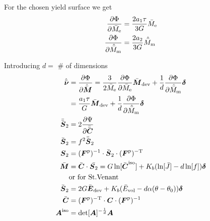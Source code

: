 \documentclass[a4paper,11pt]{article}
\newcommand{\ts}[1]{\text{\boldmath $#1$}}
\newcommand{\pderiv}[2]{\frac{\partial #1}{\partial #2}}
\newcommand{\dev}{{\rm dev}}
\newcommand{\vol}{{\rm vol}}
\newcommand{\iso}{{\rm iso}}
\newcommand{\rme}{{\rm e}}
\newcommand{\rmm}{{\rm m}}
\newcommand{\rmp}{{\rm p}}
\newcommand{\rmT}{{\rm T}}
\newcommand{\old}{{}^{\rm n}}
\providecommand{\abs}[1]{\lvert#1\rvert}
\begin{document}
For the chosen yield surface we get
\begin{align*}
	\pderiv{\Phi}{\bar M_\rme} &= \frac{2 a_1\tau}{3G}\bar M_\rme\\
	\pderiv{\Phi}{\hat{\bar M}_\rmm} &= \frac{2 a_2}{3G}\hat{\bar M}_\rmm 
\end{align*}

Introducing $d = $ \# of dimensions
\begin{align*}
	\hat{\bar{\ts\nu}} &= \pderiv{\Phi}{\hat{\bar{\ts M}}} = 
		\frac{3}{2\bar M_\rme}\pderiv{\Phi}{\bar M_\rme}\bar{\ts M}_\dev+\frac1d\pderiv{\Phi}{\hat{\bar M}_\rmm} \ts\delta\\
			&= \frac{a_1\tau}{G}\bar{\ts M}_\dev+\frac1d\pderiv{\Phi}{\hat{\bar M}_\rmm} \ts\delta\\
	\bar{\bar{\ts S}}_2 &= 2\pderiv{\Psi}{\bar{\bar{\ts C}}}\\
	\bar{\ts S}_2 &= f^2 \bar{\bar{\ts S}}_2\\
	\ts S_2 &= (\ts F^\rmp)^{-1}\cdot\bar{\ts S}_2\cdot(\ts F^\rmp)^{-\rmT}\\\
	\bar{\ts M} &= \bar{\ts C}\cdot\bar{\ts S_2} = G \ln[\bar{\ts C}^\iso]+K_b(\ln[\bar J]-d\ln[f])\ts\delta\\
	&\text{or for St.Venant}\\
	\bar{\ts S}_2 &= 2G \bar{\ts E}_\dev + K_b(\bar E_\vol -d \alpha(\theta-\theta_0))\ts\delta\\
	\bar{\ts C} &= (\ts F^\rmp)^{-\rmT}\cdot\ts C\cdot(\ts F^\rmp)^{-1}\\
	\ts A^{\rm iso} &= \det[\ts A]^{-\frac1d}\ts A
\end{align*}


\end{document}
